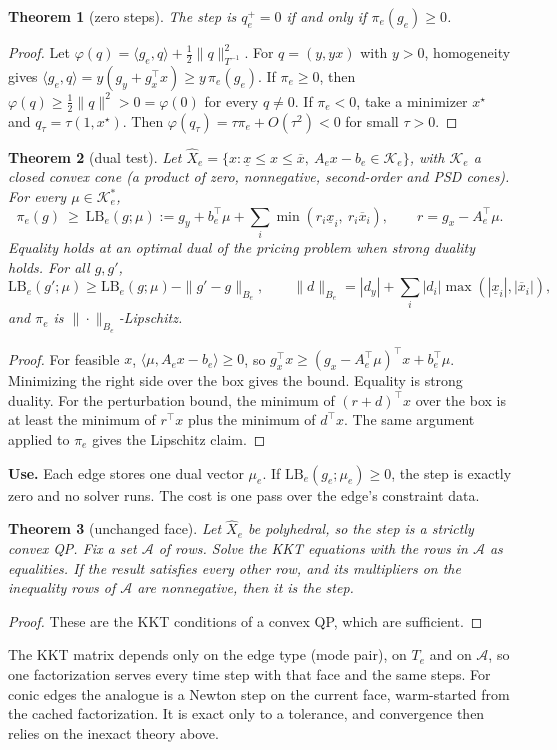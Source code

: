 \documentclass[11pt]{article}
\newcommand{\LB}{\mathrm{LB}}
\theoremstyle{plain}
\newtheorem{theorem}{Theorem}[section]
\theoremstyle{definition}
\theoremstyle{remark}
\begin{document}
\begin{theorem}[zero steps]\label{thm:zero}
The step is $q_e^+=0$ if and only if $\pi_e(g_e)\ge0$.
\end{theorem}
\begin{proof}
Let $\varphi(q)=\langle g_e,q\rangle+\tfrac12\|q\|^2_{T^{-1}}$. For $q=(y,yx)$ with $y>0$, homogeneity gives $\langle g_e,q\rangle=y(g_y+g_x^\top x)\ge y\,\pi_e(g_e)$. If $\pi_e\ge0$, then $\varphi(q)\ge\tfrac12\|q\|^2>0=\varphi(0)$ for every $q\ne0$. If $\pi_e<0$, take a minimizer $x^\star$ and $q_\tau=\tau(1,x^\star)$. Then $\varphi(q_\tau)=\tau\pi_e+O(\tau^2)<0$ for small $\tau>0$.
\end{proof}

\begin{theorem}[dual test]\label{thm:dual}
Let $\hat X_e=\{x:\underline x\le x\le\overline x,\ A_ex-b_e\in\mathcal K_e\}$, with $\mathcal K_e$ a closed convex cone (a product of zero, nonnegative, second-order and PSD cones). For every $\mu\in\mathcal K_e^*$,
\[
\pi_e(g)\ \ge\ \LB_e(g;\mu):=g_y+b_e^\top\mu+\sum_i\min(r_i\underline x_i,\ r_i\overline x_i),\qquad r=g_x-A_e^\top\mu .
\]
Equality holds at an optimal dual of the pricing problem when strong duality holds. For all $g,g'$,
\[
\LB_e(g';\mu)\ge\LB_e(g;\mu)-\|g'-g\|_{B_e},\qquad \|d\|_{B_e}=|d_y|+\textstyle\sum_i|d_i|\max(|\underline x_i|,|\overline x_i|),
\]
and $\pi_e$ is $\|\cdot\|_{B_e}$-Lipschitz.
\end{theorem}
\begin{proof}
For feasible $x$, $\langle\mu,A_ex-b_e\rangle\ge0$, so $g_x^\top x\ge(g_x-A_e^\top\mu)^\top x+b_e^\top\mu$. Minimizing the right side over the box gives the bound. Equality is strong duality. For the perturbation bound, the minimum of $(r+d)^\top x$ over the box is at least the minimum of $r^\top x$ plus the minimum of $d^\top x$. The same argument applied to $\pi_e$ gives the Lipschitz claim.
\end{proof}
\textbf{Use.} Each edge stores one dual vector $\mu_e$. If $\LB_e(g_e;\mu_e)\ge0$, the step is exactly zero and no solver runs. The cost is one pass over the edge's constraint data.

\begin{theorem}[unchanged face]\label{thm:face}
Let $\hat X_e$ be polyhedral, so the step is a strictly convex QP. Fix a set $\mathcal A$ of rows. Solve the KKT equations with the rows in $\mathcal A$ as equalities. If the result satisfies every other row, and its multipliers on the inequality rows of $\mathcal A$ are nonnegative, then it is the step.
\end{theorem}
\begin{proof}
These are the KKT conditions of a convex QP, which are sufficient.
\end{proof}
The KKT matrix depends only on the edge type (mode pair), on $T_e$ and on $\mathcal A$, so one factorization serves every time step with that face and the same steps. For conic edges the analogue is a Newton step on the current face, warm-started from the cached factorization. It is exact only to a tolerance, and convergence then relies on the inexact theory above.
\end{document}
